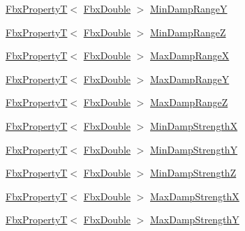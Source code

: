 \begin{Indent}
\begin{DoxyCompactItemize}
\item 
\hyperlink{class_fbx_property_t}{Fbx\+PropertyT}$<$ \hyperlink{fbxtypes_8h_a171e72a1c46fc15c1a6c9c31948c1c5b}{Fbx\+Double} $>$ \hyperlink{class_fbx_node_a27155ddcecae7a73a9fd249ccb9604f8}{Min\+Damp\+RangeY}
\item 
\hyperlink{class_fbx_property_t}{Fbx\+PropertyT}$<$ \hyperlink{fbxtypes_8h_a171e72a1c46fc15c1a6c9c31948c1c5b}{Fbx\+Double} $>$ \hyperlink{class_fbx_node_ae1e9a899c7fcc6e2e8445a4dbc127720}{Min\+Damp\+RangeZ}
\item 
\hyperlink{class_fbx_property_t}{Fbx\+PropertyT}$<$ \hyperlink{fbxtypes_8h_a171e72a1c46fc15c1a6c9c31948c1c5b}{Fbx\+Double} $>$ \hyperlink{class_fbx_node_acff786d9903523e46826fbdf9cbb5389}{Max\+Damp\+RangeX}
\item 
\hyperlink{class_fbx_property_t}{Fbx\+PropertyT}$<$ \hyperlink{fbxtypes_8h_a171e72a1c46fc15c1a6c9c31948c1c5b}{Fbx\+Double} $>$ \hyperlink{class_fbx_node_ad4259eb8b56aab70de11311ce28f1ccf}{Max\+Damp\+RangeY}
\item 
\hyperlink{class_fbx_property_t}{Fbx\+PropertyT}$<$ \hyperlink{fbxtypes_8h_a171e72a1c46fc15c1a6c9c31948c1c5b}{Fbx\+Double} $>$ \hyperlink{class_fbx_node_a29e4e0946b14c49abab84c3ec7bc0a1a}{Max\+Damp\+RangeZ}
\item 
\hyperlink{class_fbx_property_t}{Fbx\+PropertyT}$<$ \hyperlink{fbxtypes_8h_a171e72a1c46fc15c1a6c9c31948c1c5b}{Fbx\+Double} $>$ \hyperlink{class_fbx_node_ad3a1c278541e69133e0b1f3c25b98dfe}{Min\+Damp\+StrengthX}
\item 
\hyperlink{class_fbx_property_t}{Fbx\+PropertyT}$<$ \hyperlink{fbxtypes_8h_a171e72a1c46fc15c1a6c9c31948c1c5b}{Fbx\+Double} $>$ \hyperlink{class_fbx_node_ae3a54daa1551f3f33fa5d290074401fe}{Min\+Damp\+StrengthY}
\item 
\hyperlink{class_fbx_property_t}{Fbx\+PropertyT}$<$ \hyperlink{fbxtypes_8h_a171e72a1c46fc15c1a6c9c31948c1c5b}{Fbx\+Double} $>$ \hyperlink{class_fbx_node_a7d688b80e5b21f36250ec63a39b071c4}{Min\+Damp\+StrengthZ}
\item 
\hyperlink{class_fbx_property_t}{Fbx\+PropertyT}$<$ \hyperlink{fbxtypes_8h_a171e72a1c46fc15c1a6c9c31948c1c5b}{Fbx\+Double} $>$ \hyperlink{class_fbx_node_af76542d55cf747b4d133d9b4d2e703f7}{Max\+Damp\+StrengthX}
\item 
\hyperlink{class_fbx_property_t}{Fbx\+PropertyT}$<$ \hyperlink{fbxtypes_8h_a171e72a1c46fc15c1a6c9c31948c1c5b}{Fbx\+Double} $>$ \hyperlink{class_fbx_node_af62a8865505138ce889586f13535bc0e}{Max\+Damp\+StrengthY}
\item 

\end{DoxyCompactItemize}
\end{Indent}
